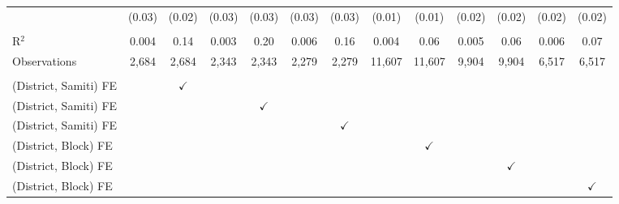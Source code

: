 \begin{adjustbox}{max width=\linewidth}
\begin{threeparttable}[b]
\begin{tabular}{lcccccccccccc}
                                                        & (0.03)       & (0.02)        & (0.03)       & (0.03)        & (0.03)       & (0.03)        & (0.01)        & (0.01)        & (0.02)        & (0.02)        & (0.02)       & (0.02)\\   
          \\
         R$^2$                                          & 0.004        & 0.14          & 0.003        & 0.20          & 0.006        & 0.16          & 0.004         & 0.06          & 0.005         & 0.06          & 0.006        & 0.07\\  
         Observations                                   & 2,684        & 2,684         & 2,343        & 2,343         & 2,279        & 2,279         & 11,607        & 11,607        & 9,904         & 9,904         & 6,517        & 6,517\\  
          \\
         (District, Samiti) FE                          &              & $\checkmark$  &              &               &              &               &               &               &               &               &              & \\  
         (District, Samiti) FE                          &              &               &              & $\checkmark$  &              &               &               &               &               &               &              & \\  
         (District, Samiti) FE                          &              &               &              &               &              & $\checkmark$  &               &               &               &               &              & \\  
         (District, Block) FE                           &              &               &              &               &              &               &               & $\checkmark$  &               &               &              & \\  
         (District, Block) FE                           &              &               &              &               &              &               &               &               &               & $\checkmark$  &              & \\  
         (District, Block) FE                           &              &               &              &               &              &               &               &               &               &               &              & $\checkmark$\\   
         \bottomrule
      \end{tabular}
      

\end{threeparttable}
\end{adjustbox}
